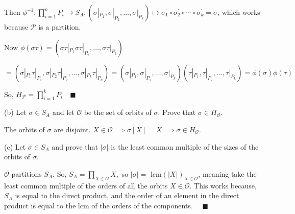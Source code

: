 \documentclass{article}
\begin{document}
Then $\phi^{-1}: \prod_{i=1}^k P_i \rightarrow S_A; (\sigma|_{P_1},
\sigma|_{P_2}, \dots, \sigma|_{P_k}) \mapsto \sigma_1^\prime \circ \sigma_2^\prime \circ \cdots
\circ \sigma_k^\prime = \sigma$, which
works because $\mathcal{P}$ is a partition.

Now $\phi(\sigma\tau) = (\sigma\tau|_{P_1}
\sigma\tau|_{P_2}, \dots, \sigma\tau|_{P_k})$

$= (\sigma|_{P_1}\tau|_{P_1},
\sigma|_{P_2}\tau|_{P_2}, \dots, \sigma|_{P_k}\tau|_{P_k}) =(\sigma|_{P_1},
\sigma|_{P_2}, \dots, \sigma|_{P_k}) (\tau|_{P_1},
\tau|_{P_2}, \dots, \tau|_{P_k}) = \phi(\sigma)\phi(\tau)$

So, $H_{\mathcal{P}} = \prod_{i=1}^k P_i \quad \blacksquare$

(b) Let $\sigma \in S_A$ and let $\mathcal{O}$ be the set of orbits of
$\sigma.$ Prove that $\sigma \in H_{\mathcal{O}}.$

The orbits of $\sigma$ are disjoint. $X\in \mathcal O \implies
\sigma[X] = X \implies  \sigma \in H_{\mathcal{O}}.$

(c) Let $\sigma \in S_A$ and prove that $|\sigma|$ is the least common
multiple of the sizes of the orbits of $\sigma$.

$\mathcal{O}$ partitions $S_A$. So, $S_A = \prod_{X\in \mathcal{O}}
X,$  so $|\sigma| =$ lcm$(|X|)_{X\in \mathcal{O}}$, meaning take the
least common multiple of the orders of all the orbits $X \in \mathcal{O}.$ This
works because, $S_A$ is equal to the direct product, and the order of
an element in the direct product is equal to the lcm of the orders of
the components. $\quad \blacksquare$
\end{document}
